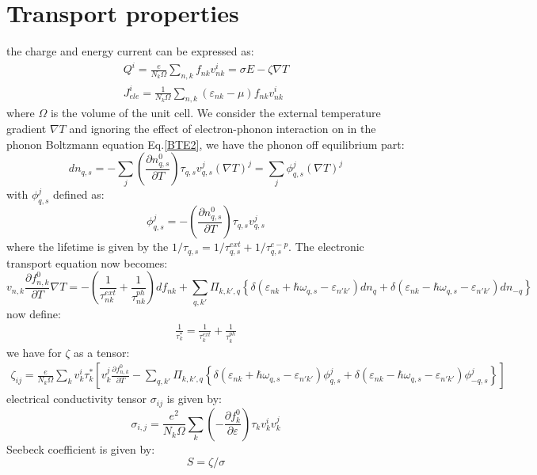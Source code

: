 \documentclass{article}
\newcommand{\pfrac}[2]{\frac{\partial #1}{\partial #2}}
\begin{document}
\section{Transport properties}
the charge and energy current can be expressed as:
\begin{gather}
    Q^i = \frac{e}{N_k \Omega} \sum_{n,k} f_{nk} v_{nk}^i = \sigma E - \zeta \nabla T\\
    J_{ele}^i = \frac{1}{N_k \Omega} \sum_{n,k} (\varepsilon_{nk} - \mu)f_{nk} v_{nk}^i 
\end{gather}
where $\Omega$ is the volume of the unit cell.
We consider the external temperature gradient $\nabla T$ and ignoring the effect of electron-phonon
interaction on in the phonon Boltzmann equation Eq.\ref{BTE2}, we have the 
phonon off equilibrium part:
\begin{equation}
    dn_{q,s} = -\sum_j \left( \frac{\partial n_{q,s}^0}{\partial T} \right) \tau_{q,s} v_{q,s}^j (\nabla T)^j = \sum_j \phi_{q,s}^j (\nabla T)^j
\end{equation}
with $\phi_{q,s}^j$ defined as:
\begin{equation}
    \phi_{q,s}^j = - \left( \frac{\partial n_{q,s}^0}{\partial T} \right) \tau_{q,s} v_{q,s}^j
\end{equation}
where the lifetime is given by the $1/\tau_{q,s} = 1/\tau_{q,s}^{ext} + 1/\tau_{q,s}^{e-p}$.
The electronic transport equation now becomes:
\begin{equation}
    v_{n,k} \pfrac{f_{n,k}^0}{T} \nabla T = - \left( \frac{1}{\tau_{nk}^{ext}} + \frac{1}{\tau_{nk}^{ph}} \right) df_{nk} + 
    \sum_{q,k'} \Pi_{k,k',q} \left\{  \delta(\varepsilon_{nk} + \hbar\omega_{q,s} - \varepsilon_{n'k'}) dn_q + \delta(\varepsilon_{nk} - \hbar\omega_{q,s} - \varepsilon_{n'k'})dn_{-q} \right\} 
\end{equation}
now define:
\begin{gather}
    \frac{1}{\tau^*_{k}} = \frac{1}{\tau_{k}^{ext}} + \frac{1}{\tau_{k}^{ph}}
\end{gather}
we have for $\zeta$ as a tensor:
\begin{align}
    \zeta_{ij} = \frac{e}{N_k \Omega} \sum_{k} v_k^i \tau_k^*
    \left[ v_k^j \pfrac{f_{n,k}^0}{T} - \sum_{q,k'} \Pi_{k,k',q} \left\{  \delta(\varepsilon_{nk} + \hbar\omega_{q,s} - \varepsilon_{n'k'}) \phi_{q,s}^j + \delta(\varepsilon_{nk} - \hbar\omega_{q,s} - \varepsilon_{n'k'})\phi_{-q,s}^j \right\}  \right]
\end{align}
electrical conductivity tensor $\sigma_{ij}$ is given by:
\begin{equation}
    \sigma_{i,j} = \frac{e^2}{N_k \Omega} \sum_{k} \left( -\pfrac{f_k^0}{\varepsilon} \right) \tau_k v_k^i v_k^j
\end{equation}
Seebeck coefficient is given by:
\begin{equation}
    S = \zeta / \sigma
\end{equation}
\end{document}
